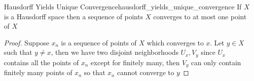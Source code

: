 \begin{proposition}{Hausdorff Yields Unique
Convergence}{hausdorff_yields_unique_convergence}
If \( X \) is a Hausdorff space then a sequence of points \( X \) converges to
at most one point of \( X \) 
\end{proposition}
\begin{proof}
    Suppose \( x _{ n }  \) is a sequence of points of \( X \) which converges
    to \( x \). Let \( y \in  X \) such that \( y \neq x \), then we have two
    disjoint neighborhoods \( U _{ x } , V _{ y }  \) since \( U _{ x }  \)
    contains all the points of \( x _{ n }  \) except for finitely many, then \(
    V _{ y } \) can only contain finitely many points of \( x _{ n }  \) so that
    \( x _{ n }  \) cannot converge to \( y \) 
\end{proof}
